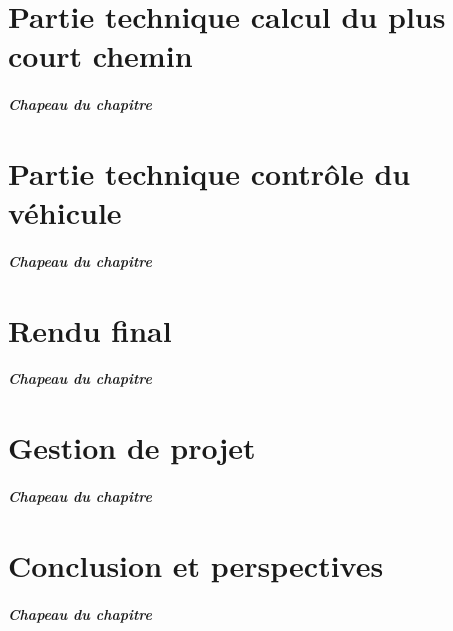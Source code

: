 \documentclass[12pt, french]{report}
\begin{document}
\chapter{Partie technique calcul du plus court chemin}
\paragraph{Chapeau du chapitre}

\clearpage

\chapter{Partie technique contrôle du véhicule}
\paragraph{Chapeau du chapitre}

\clearpage

\chapter{Rendu final}
\paragraph{Chapeau du chapitre}

\clearpage

\chapter{Gestion de projet}
\paragraph{Chapeau du chapitre}

\clearpage

\chapter{Conclusion et perspectives}
\paragraph{Chapeau du chapitre}

\clearpage



\clearpage


\clearpage
\end{document}
